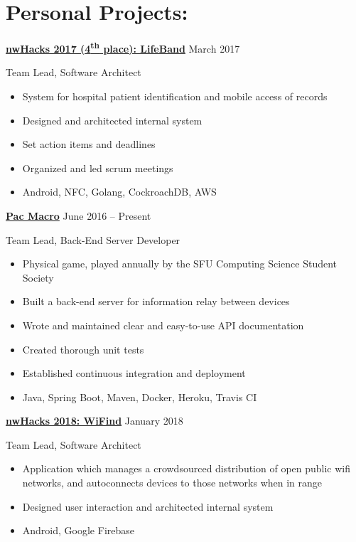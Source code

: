 \pagebreak

\section*{Personal Projects:}

	\begin{large}
		\textbf{\href{https://github.com/nwHacks2017/nwHacks2017.github.io}{nwHacks 2017 (4\textsuperscript{th} place): LifeBand}} \hfill March 2017 \\
	\end{large}
	Team Lead, Software Architect
	\begin{itemize}
		\item System for hospital patient identification and mobile access of records
		\item Designed and architected internal system
		\item Set action items and deadlines
		\item Organized and led scrum meetings
		\item Android, NFC, Golang, CockroachDB, AWS
	\end{itemize}

	\hspace{1cm}

	\noindent
	\begin{large}
		\textbf{\href{https://github.com/pacmacro/pm-server}{Pac Macro}} \hfill June 2016 -- Present \\
	\end{large}
	Team Lead, Back-End Server Developer
	\begin{itemize}
		\item Physical game, played annually by the SFU Computing Science Student Society
		\item Built a back-end server for information relay between devices
		\item Wrote and maintained clear and easy-to-use API documentation
		\item Created thorough unit tests
		\item Established continuous integration and deployment
		\item Java, Spring Boot, Maven, Docker, Heroku, Travis CI
	\end{itemize}

	\hspace{1cm}

	\noindent
	\begin{large}
		\textbf{\href{https://devpost.com/software/wifind}{nwHacks 2018: WiFind}} \hfill January 2018 \\
	\end{large}
	Team Lead, Software Architect
	\begin{itemize}
		\item Application which manages a crowdsourced distribution of open public wifi networks, and autoconnects devices to those networks when in range
		\item Designed user interaction and architected internal system
		\item Android, Google Firebase
	\end{itemize}


